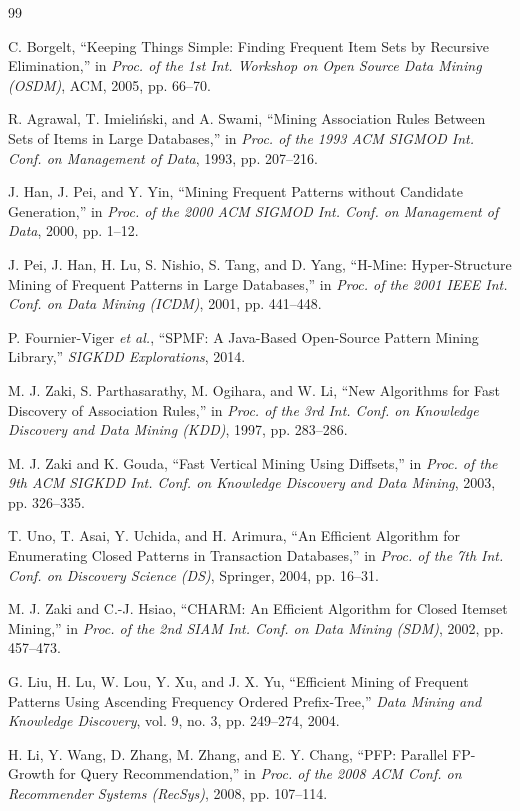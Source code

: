 \documentclass[12pt,a4paper]{report}
\begin{document}
\renewcommand{\bibname}{Tài liệu tham khảo}
\begin{thebibliography}{99}

C. Borgelt, ``Keeping Things Simple: Finding Frequent Item Sets by Recursive Elimination,'' in \textit{Proc. of the 1st Int. Workshop on Open Source Data Mining (OSDM)}, ACM, 2005, pp. 66--70.

R. Agrawal, T. Imieli\'{n}ski, and A. Swami, ``Mining Association Rules Between Sets of Items in Large Databases,'' in \textit{Proc. of the 1993 ACM SIGMOD Int. Conf. on Management of Data}, 1993, pp. 207--216.

J. Han, J. Pei, and Y. Yin, ``Mining Frequent Patterns without Candidate Generation,'' in \textit{Proc. of the 2000 ACM SIGMOD Int. Conf. on Management of Data}, 2000, pp. 1--12.

J. Pei, J. Han, H. Lu, S. Nishio, S. Tang, and D. Yang, ``H-Mine: Hyper-Structure Mining of Frequent Patterns in Large Databases,'' in \textit{Proc. of the 2001 IEEE Int. Conf. on Data Mining (ICDM)}, 2001, pp. 441--448.

P. Fournier-Viger \textit{et al.}, ``SPMF: A Java-Based Open-Source Pattern Mining Library,'' \textit{SIGKDD Explorations}, 2014.

M. J. Zaki, S. Parthasarathy, M. Ogihara, and W. Li, ``New Algorithms for Fast Discovery of Association Rules,'' in \textit{Proc. of the 3rd Int. Conf. on Knowledge Discovery and Data Mining (KDD)}, 1997, pp. 283--286.

M. J. Zaki and K. Gouda, ``Fast Vertical Mining Using Diffsets,'' in \textit{Proc. of the 9th ACM SIGKDD Int. Conf. on Knowledge Discovery and Data Mining}, 2003, pp. 326--335.

T. Uno, T. Asai, Y. Uchida, and H. Arimura, ``An Efficient Algorithm for Enumerating Closed Patterns in Transaction Databases,'' in \textit{Proc. of the 7th Int. Conf. on Discovery Science (DS)}, Springer, 2004, pp. 16--31.

M. J. Zaki and C.-J. Hsiao, ``CHARM: An Efficient Algorithm for Closed Itemset Mining,'' in \textit{Proc. of the 2nd SIAM Int. Conf. on Data Mining (SDM)}, 2002, pp. 457--473.

G. Liu, H. Lu, W. Lou, Y. Xu, and J. X. Yu, ``Efficient Mining of Frequent Patterns Using Ascending Frequency Ordered Prefix-Tree,'' \textit{Data Mining and Knowledge Discovery}, vol. 9, no. 3, pp. 249--274, 2004.

H. Li, Y. Wang, D. Zhang, M. Zhang, and E. Y. Chang, ``PFP: Parallel FP-Growth for Query Recommendation,'' in \textit{Proc. of the 2008 ACM Conf. on Recommender Systems (RecSys)}, 2008, pp. 107--114.

\end{thebibliography}
 
\end{document}
